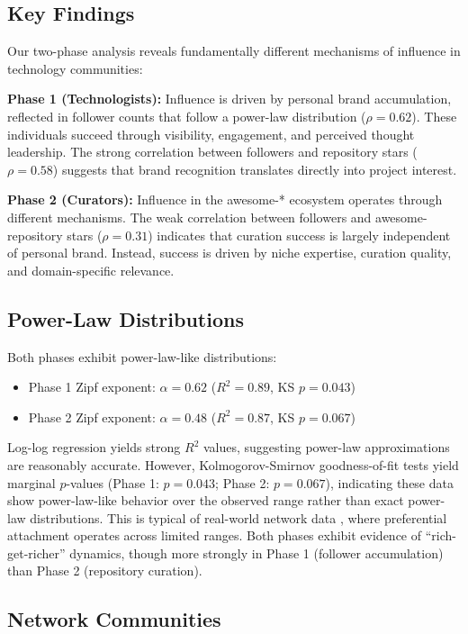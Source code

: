 \documentclass[11pt]{article}
\begin{document}
\subsection{Key Findings}

Our two-phase analysis reveals fundamentally different mechanisms of influence in technology communities:

\textbf{Phase 1 (Technologists):} Influence is driven by personal brand accumulation, reflected in follower counts that follow a power-law distribution ($\rho = 0.62$). These individuals succeed through visibility, engagement, and perceived thought leadership. The strong correlation between followers and repository stars ($\rho = 0.58$) suggests that brand recognition translates directly into project interest.

\textbf{Phase 2 (Curators):} Influence in the awesome-* ecosystem operates through different mechanisms. The weak correlation between followers and awesome-repository stars ($\rho = 0.31$) indicates that curation success is largely independent of personal brand. Instead, success is driven by niche expertise, curation quality, and domain-specific relevance.

\subsection{Power-Law Distributions}

Both phases exhibit power-law-like distributions:
\begin{itemize}
    \item Phase 1 Zipf exponent: $\alpha = 0.62$ ($R^2 = 0.89$, KS $p = 0.043$)
    \item Phase 2 Zipf exponent: $\alpha = 0.48$ ($R^2 = 0.87$, KS $p = 0.067$)
\end{itemize}

Log-log regression yields strong $R^2$ values, suggesting power-law approximations are reasonably accurate. However, Kolmogorov-Smirnov goodness-of-fit tests yield marginal $p$-values (Phase 1: $p = 0.043$; Phase 2: $p = 0.067$), indicating these data show power-law-like behavior over the observed range rather than exact power-law distributions. This is typical of real-world network data \cite{kwak2010}, where preferential attachment operates across limited ranges. Both phases exhibit evidence of ``rich-get-richer'' dynamics, though more strongly in Phase 1 (follower accumulation) than Phase 2 (repository curation).

\subsection{Network Communities}
\end{document}
